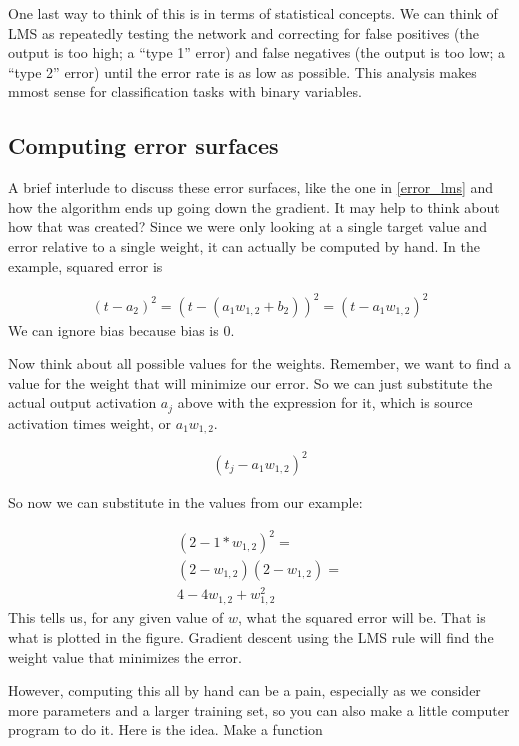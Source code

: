 One last way to think of this is in terms of statistical concepts. We can think of LMS as repeatedly testing the network and correcting for false positives (the output is too high; a ``type 1'' error) and false negatives (the output is too low; a ``type 2'' error) until the error rate is as low as possible. This analysis makes mmost sense for classification tasks with binary variables.
 \subsection{Computing error surfaces}

A brief interlude to discuss these error surfaces, like the one in \ref{error_lms} and how the algorithm ends up going down the gradient. It may help to think about how that was created? Since we were only looking at a single target value and error relative to a single weight, it can actually be computed by hand. In the example, squared error is

\begin{eqnarray*}
(t - a_2)^2 =  (t - (a_1 w_{1,2} + b_2))^2 = (t - a_1 w_{1,2})^2  
\end{eqnarray*}
We can ignore bias because bias is 0.

Now think about all possible values for the weights. Remember, we want to find a value for the weight that will minimize our error. So we can just substitute the actual output activation $a_j$ above with the expression for it, which is source activation times weight, or  $a_1 w_{1,2}$.

\begin{eqnarray*}
(t_j - a_1 w_{1,2})^2
\end{eqnarray*}

So now we can substitute in the values from our example:

\begin{eqnarray*}
(2 - 1 * w_{1,2})^2 = \\
(2 - w_{1,2}) (2 - w_{1,2} ) =  \\
4-4w_{1,2}+w_{1,2}^2
\end{eqnarray*}
This tells us, for any given value of $w$, what the squared error will be. That is what is plotted in the figure. Gradient descent using the LMS rule will find the weight value that minimizes the error.

However, computing this all by hand can be  a pain, especially as we consider more parameters and a larger training set, so you can also make a little computer program to do it.  Here is the idea. Make a function

